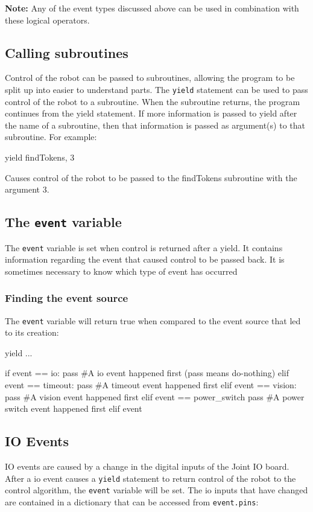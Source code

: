 \documentclass[a4paper, 12pt]{article}
\begin{document}
\noindent\textbf{Note:} Any of the event types discussed above can be used in combination with these logical operators.
\subsection{Calling subroutines}
Control of the robot can be passed to subroutines, allowing the program to be
split up into easier to understand parts.  The \texttt{yield} statement can be
used to pass control of the robot to a subroutine.  When the subroutine returns,
the program continues from the yield statement.  If more information is
passed to yield after the name of a subroutine, then that information is passed
as argument(s) to that subroutine.  For example:

\begin{verbatimtab}
yield findTokens, 3
\end{verbatimtab}

Causes control of the robot to be passed to the findTokens subroutine with the
argument 3.

\subsection{The \texttt{event} variable}
The \texttt{event} variable is set when control is returned after a
yield. It contains information regarding the event that caused control
to be passed back. It is sometimes necessary to know which type of event has occurred 

\subsubsection{Finding the event source}
The \texttt{event} variable will return true when compared to the
event source that led to its creation:

\begin{python}
\begin{verbatimtab}
yield ...

if event == io:
	pass #A io event happened first (pass means do-nothing)
elif event == timeout:
	pass #A timeout event happened first
elif event == vision:
 	pass #A vision event happened first
elif event == power_switch
	pass #A power switch event happened first
elif event
\end{verbatimtab}
\end{python}

\subsection{IO Events}
IO events are caused by a change in the digital inputs of the
Joint IO board. After a io event causes a \texttt{yield} statement to
return control of the robot to the control algorithm, the
\texttt{event} variable will be set. The io inputs that have changed
are contained in a dictionary that can be accessed from \texttt{event.pins}: 
\end{document}

